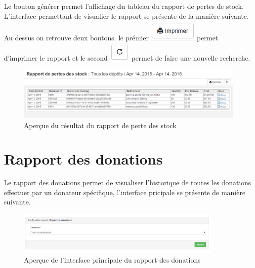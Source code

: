 \documentclass[12pt,a4paper]{report}
\begin{document}
Le bouton générer permet l'affichage du tableau du rapport de pertes de stock. L'interface permettant de visualier le rapport se présente de la manière suivante. Au dessus on retrouve deux boutons. le prémier 
\includegraphics[scale=0.7]{pic/Print.png} permet d'imprimer le rapport et le second \includegraphics[scale=0.7]{pic/refresh.png} permet de faire une nouvelle recherche.


\begin{figure}[h]
\begin{center}
\includegraphics[width=12cm]{pic/PerteStockRapport.png}
\end{center}
\caption{Aperçue du résultat du rapport de perte des stock}
\label{Aperçue du résultat du rapport de perte des stock}
\end{figure}

\newpage
\section{Rapport des donations}
Le rapport des donations permet de visualiser l'historique de toutes les donations effectuer par un donateur spécifique, l'interface pricipale se présente de manière suivante. 

\begin{figure}[h]
\begin{center}
\includegraphics[width=10cm]{pic/RapDonnInterface.png}
\end{center}
\caption{Aperçue de l'interface principale du rapport des donations}
\label{Aperçue de l'interface principale du rapport des donations}
\end{figure}
\end{document}
